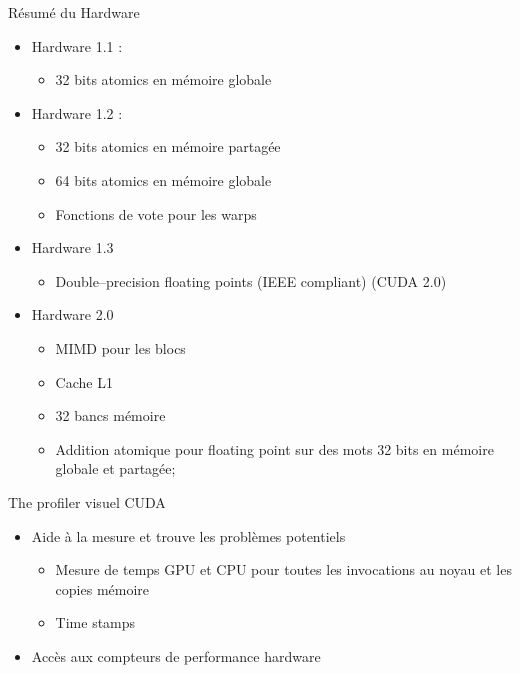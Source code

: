 \documentclass{beamer}
\begin{document}
\begin{frame}{Résumé du Hardware}

\begin{itemize}
\item Hardware 1.1 : 
  \begin{itemize}
    \item 32 bits atomics en mémoire globale
    \end{itemize}
\item Hardware 1.2 : 
    \begin{itemize}
    \item 32 bits atomics en mémoire partagée
    \item 64 bits atomics en mémoire globale
    \item Fonctions de vote pour les warps
    \end{itemize}
\item Hardware 1.3
  \begin{itemize}
  \item Double--precision floating points (IEEE compliant)
    (CUDA 2.0)
  \end{itemize}
\item Hardware 2.0
    \begin{itemize}
    \item MIMD pour les blocs 
    \item Cache L1
    \item 32 bancs mémoire
    \item Addition atomique pour floating point sur des mots 32 bits en mémoire globale et partagée;
    \end{itemize}
\end{itemize}

\end{frame}

\begin{frame}{The profiler visuel CUDA}

\begin{itemize}
\item Aide à la mesure et trouve les problèmes potentiels
  \begin{itemize}
  \item Mesure de temps GPU et CPU pour toutes les invocations au noyau et les copies mémoire
  \item Time stamps
  \end{itemize}
\item Accès aux compteurs de performance hardware
\end{itemize}

\begin{minipage}{48mm}
\end{minipage}
\begin{minipage}{48mm}
\end{minipage}

\end{frame}
\end{document}
